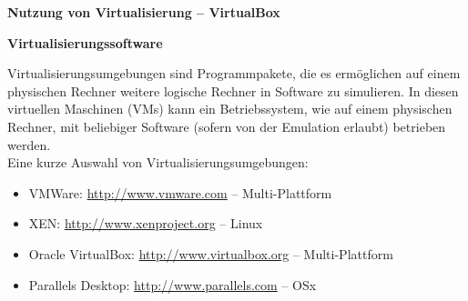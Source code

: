\documentclass[paper=a4,fontsize=11pt]{scrartcl}%
\numberwithin{equation}{section}
\begin{document}
\begin{center}
\Large{\textbf{Nutzung von Virtualisierung -- VirtualBox}}
\end{center}
\begin{center}\Large{\textbf{Virtualisierungssoftware}}\end{center}\vskip0.25in
Virtualisierungsumgebungen sind Programmpakete, die es ermöglichen auf einem physischen Rechner weitere logische Rechner in Software zu simulieren. In diesen virtuellen Maschinen (VMs) kann ein Betriebssystem, wie auf einem physischen Rechner, mit beliebiger Software (sofern von der Emulation erlaubt) betrieben werden.\\
Eine kurze Auswahl von Virtualisierungsumgebungen:
\begin{itemize}
	\item VMWare: \url{http://www.vmware.com} -- Multi-Plattform
	\item XEN: \url{http://www.xenproject.org} -- Linux
	\item Oracle VirtualBox: \url{http://www.virtualbox.org} -- Multi-Plattform
	\item Parallels Desktop: \url{http://www.parallels.com} -- OSx
\end{itemize}
\end{document}
